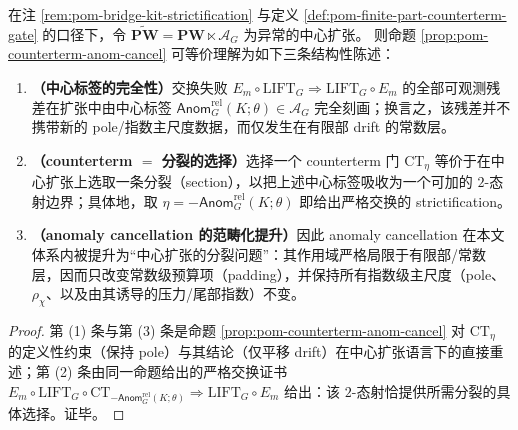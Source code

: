 \begin{theorem}\label{thm:pom-strictification-splitting}
在注 \ref{rem:pom-bridge-kit-strictification} 与定义 \ref{def:pom-finite-part-counterterm-gate} 的口径下，令
\(
\widetilde{\mathbf{PW}}=\mathbf{PW}\ltimes \mathcal{A}_G
\)
为异常的中心扩张。
则命题 \ref{prop:pom-counterterm-anom-cancel} 可等价理解为如下三条结构性陈述：
\begin{enumerate}
  \item \textbf{（中心标签的完全性）}交换失败 \(E_m\circ \mathrm{LIFT}_G \Rightarrow \mathrm{LIFT}_G\circ E_m\) 的全部可观测残差在扩张中由中心标签
  \(\mathsf{Anom}^{\mathrm{rel}}_{G}(K;\theta)\in\mathcal{A}_G\)
  完全刻画；换言之，该残差并不携带新的 pole/指数主尺度数据，而仅发生在有限部 drift 的常数层。
  \item \textbf{（counterterm \(=\) 分裂的选择）}选择一个 counterterm 门 \(\mathrm{CT}_\eta\) 等价于在中心扩张上选取一条分裂（section），以把上述中心标签吸收为一个可加的 \(2\)-态射边界；具体地，取
  \(\eta=-\mathsf{Anom}^{\mathrm{rel}}_{G}(K;\theta)\)
  即给出严格交换的 strictification。
  \item \textbf{（anomaly cancellation 的范畴化提升）}因此 anomaly cancellation 在本文体系内被提升为“中心扩张的分裂问题”：其作用域严格局限于有限部/常数层，因而只改变常数级预算项（padding），并保持所有指数级主尺度（pole、\(\rho_\chi\)、以及由其诱导的压力/尾部指数）不变。
\end{enumerate}
\end{theorem}

\begin{proof}
第 (1) 条与第 (3) 条是命题 \ref{prop:pom-counterterm-anom-cancel} 对 \(\mathrm{CT}_\eta\) 的定义性约束（保持 pole）与其结论（仅平移 drift）在中心扩张语言下的直接重述；第 (2) 条由同一命题给出的严格交换证书
\(
E_m\circ \mathrm{LIFT}_G\circ \mathrm{CT}_{-\mathsf{Anom}^{\mathrm{rel}}_{G}(K;\theta)}
\Rightarrow
\mathrm{LIFT}_G\circ E_m
\)
给出：该 \(2\)-态射恰提供所需分裂的具体选择。证毕。
\end{proof}


